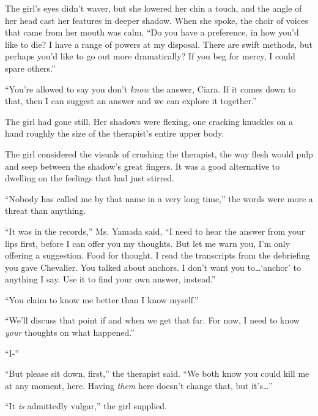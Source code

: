 The girl's eyes didn't waver, but she lowered her chin a touch, and the angle of her head cast her features in deeper shadow.  When she spoke, the choir of voices that came from her mouth was calm.  ``Do you have a preference, in how you'd like to die?  I have a range of powers at my disposal.  There are swift methods, but perhaps you'd like to go out more dramatically?  If you beg for mercy, I could spare others.''



``You're allowed to say you don't\emph{ know }the answer, Ciara.  If it comes down to that, then I can suggest an answer and we can explore it together.''



The girl had gone still.  Her shadows were flexing, one cracking knuckles on a hand roughly the size of the therapist's entire upper body.



The girl considered the visuals of crushing the therapist, the way flesh would pulp and seep between the shadow's great fingers.  It was a good alternative to dwelling on the feelings that had just stirred.



``Nobody has called me by that name in a very long time,'' the words were more a threat than anything.



``It was in the records,''  Ms. Yamada said, ``I need to hear the answer from your lips first, before I can offer you my thoughts.  But let me warn you, I'm only offering a suggestion.  Food for thought.  I read the transcripts from the debriefing you gave Chevalier.  You talked about anchors.  I don't want you to\ldots `anchor' to anything I say.  Use it to find your own answer, instead.''



``You claim to know me better than I know myself.''



``We'll discuss that point if and when we get that far.  For now, I need to know \emph{your} thoughts on what happened.''



``I-''



``But please sit down, first,'' the therapist said.  ``We both know you could kill me at any moment, here.  Having \emph{them} here doesn't change that, but it's\ldots''



``It \emph{is} admittedly vulgar,'' the girl supplied.



